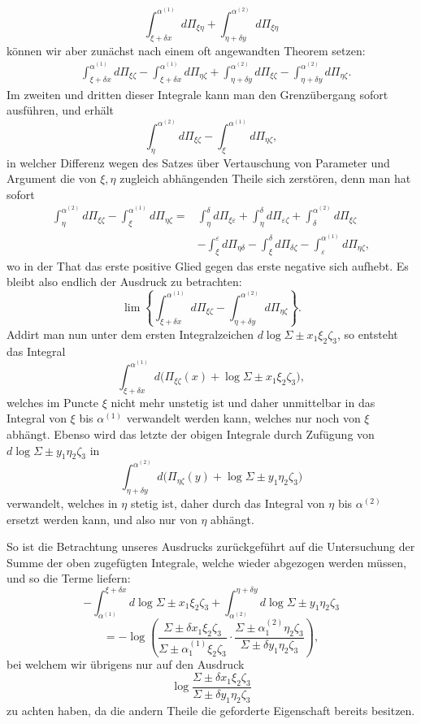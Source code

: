 \documentclass[10pt]{article}
\begin{document}
\[
\int_{\xi+\delta x}^{\alpha^{(1)}}d\Pi_{\xi\eta}
+\int_{\eta+\delta y}^{\alpha^{(2)}}d\Pi_{\xi\eta}
\]
können wir aber zunächst nach einem oft angewandten Theorem setzen:
\[
\begin{aligned}
&\int_{\xi+\delta x}^{\alpha^{(1)}}d\Pi_{\xi\zeta}
-\int_{\xi+\delta x}^{\alpha^{(1)}}d\Pi_{\eta\zeta}
+\int_{\eta+\delta y}^{\alpha^{(2)}}d\Pi_{\xi\zeta}
-\int_{\eta+\delta y}^{\alpha^{(2)}}d\Pi_{\eta\zeta}.
\end{aligned}
\]
Im zweiten und dritten dieser Integrale kann man den Grenzübergang sofort ausführen, und erhält
\[
\int_{\eta}^{\alpha^{(2)}}d\Pi_{\xi\zeta}-\int_{\xi}^{\alpha^{(1)}}d\Pi_{\eta\zeta},
\]
in welcher Differenz wegen des Satzes über Vertauschung von Parameter und Argument die von \(\xi,\eta\) zugleich abhängenden Theile sich zerstören, denn man hat sofort
\[
\begin{aligned}
\int_{\eta}^{\alpha^{(2)}}d\Pi_{\xi\zeta}-\int_{\xi}^{\alpha^{(1)}}d\Pi_{\eta\zeta}
={}&\int_{\eta}^{\delta}d\Pi_{\xi\varepsilon}
+\int_{\eta}^{\delta}d\Pi_{\varepsilon\zeta}
+\int_{\delta}^{\alpha^{(2)}}d\Pi_{\xi\zeta}\\
&-\int_{\xi}^{\varepsilon}d\Pi_{\eta\delta}
-\int_{\xi}^{\delta}d\Pi_{\delta\zeta}
-\int_{\varepsilon}^{\alpha^{(1)}}d\Pi_{\eta\zeta},
\end{aligned}
\]
wo in der That das erste positive Glied gegen das erste negative sich aufhebt. Es bleibt also endlich der Ausdruck zu betrachten:
\[
\lim\left\{\int_{\xi+\delta x}^{\alpha^{(1)}}d\Pi_{\xi\zeta}
-\int_{\eta+\delta y}^{\alpha^{(2)}}d\Pi_{\eta\zeta}\right\}.
\]
Addirt man nun unter dem ersten Integralzeichen \(d\log\Sigma\pm x_1\xi_2\zeta_3\), so entsteht das Integral
\[
\int_{\xi+\delta x}^{\alpha^{(1)}}d\bigl(\Pi_{\xi\zeta}(x)+\log\Sigma\pm x_1\xi_2\zeta_3\bigr),
\]
welches im Puncte \(\xi\) nicht mehr unstetig ist und daher unmittelbar in das Integral von \(\xi\) bis \(\alpha^{(1)}\) verwandelt werden kann, welches nur noch von \(\xi\) abhängt. Ebenso wird das letzte der obigen Integrale durch Zufügung von \(d\log\Sigma\pm y_1\eta_2\zeta_3\) in
\[
\int_{\eta+\delta y}^{\alpha^{(2)}}d\bigl(\Pi_{\eta\zeta}(y)+\log\Sigma\pm y_1\eta_2\zeta_3\bigr)
\]
verwandelt, welches in \(\eta\) stetig ist, daher durch das Integral von \(\eta\) bis \(\alpha^{(2)}\) ersetzt werden kann, und also nur von \(\eta\) abhängt.

So ist die Betrachtung unseres Ausdrucks zurückgeführt auf die Untersuchung der Summe der oben zugefügten Integrale, welche wieder abgezogen werden müssen, und so die Terme liefern:
\[
-\int_{\alpha^{(1)}}^{\xi+\delta x}d\log\Sigma\pm x_1\xi_2\zeta_3
+\int_{\alpha^{(2)}}^{\eta+\delta y}d\log\Sigma\pm y_1\eta_2\zeta_3
\]
\[
=-\log\left(\frac{\Sigma\pm\delta x_1\xi_2\zeta_3}{\Sigma\pm\alpha_1^{(1)}\xi_2\zeta_3}\cdot
\frac{\Sigma\pm\alpha_1^{(2)}\eta_2\zeta_3}{\Sigma\pm\delta y_1\eta_2\zeta_3}\right),
\]
bei welchem wir übrigens nur auf den Ausdruck
\[
\log\frac{\Sigma\pm\delta x_1\xi_2\zeta_3}{\Sigma\pm\delta y_1\eta_2\zeta_3}
\]
zu achten haben, da die andern Theile die geforderte Eigenschaft bereits besitzen.
\end{document}
